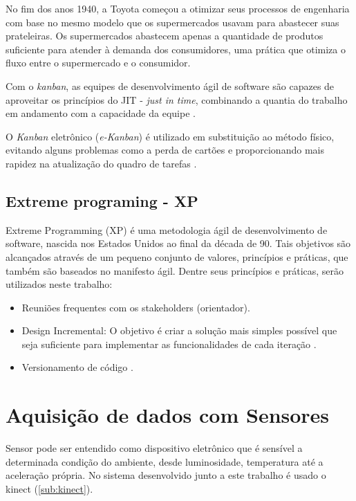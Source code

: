 No fim dos anos 1940, a Toyota começou a otimizar seus processos de engenharia com base no mesmo modelo que os supermercados usavam para abastecer suas prateleiras. Os supermercados abastecem apenas a quantidade de produtos suficiente para atender à demanda dos consumidores, uma prática que otimiza o fluxo entre o supermercado e o consumidor.

Com o \textit{kanban}, as equipes de desenvolvimento ágil de software são capazes de aproveitar os princípios do JIT - \textit{just in time}, combinando a quantia do trabalho em andamento com a capacidade da equipe \cite{kanban1}.

O \textit{Kanban} eletrônico (\textit{e-Kanban}) é utilizado em substituição ao método físico, evitando alguns problemas como a perda de cartões e proporcionando mais rapidez na atualização do quadro de tarefas \cite{kanban}.



\subsection{Extreme programing - XP}
\label{sec:xp}
Extreme Programming (XP) é uma metodologia ágil de desenvolvimento de software,
nascida nos Estados Unidos ao final da década de 90. Tais objetivos são
alcançados através de um pequeno conjunto de valores, princípios
 e práticas, que também são baseados no manifesto ágil. Dentre seus princípios
e práticas, serão utilizados neste trabalho:

  \begin{itemize}
  \item Reuniões frequentes com os stakeholders (orientador).
  \item Design Incremental: O objetivo é criar a solução mais simples possível
  que seja suficiente para implementar as funcionalidades de cada iteração \cite{praticaXp}.
  \item Versionamento de código \cite{praticaXp}.
  \end{itemize}

  \section{Aquisição de dados com Sensores}
  \label{sec:aquisicaoSensores}

    Sensor pode ser entendido como dispositivo eletrônico que é sensível a determinada
  condição do ambiente, desde luminosidade, temperatura até a aceleração própria.
  No sistema desenvolvido junto a este trabalho é usado o kinect (\ref{sub:kinect}).


